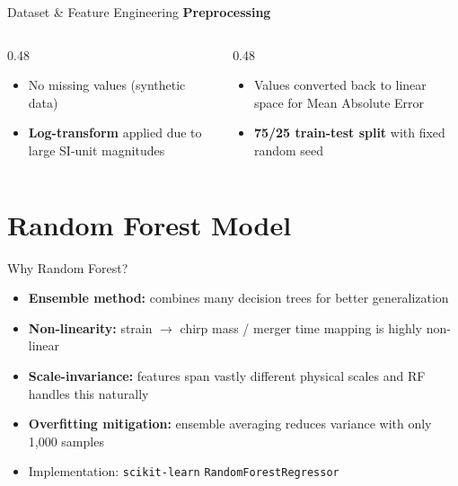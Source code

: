 \documentclass[aspectratio=169]{beamer}
\begin{document}
\begin{frame}{Dataset \& Feature Engineering}
  \vspace{0.8cm}
  \textbf{Preprocessing}
  \begin{columns}[t]
    \begin{column}{0.48\textwidth}
      \begin{itemize}
        \item No missing values (synthetic data)
        \vspace{0.2cm}
        \item \textbf{Log-transform} applied due to large SI-unit magnitudes
      \end{itemize}
    \end{column}
    \begin{column}{0.48\textwidth}
      \begin{itemize}
        \item Values converted back to linear space for Mean Absolute Error
        \vspace{0.2cm}
        \item \textbf{75/25 train-test split} with fixed random seed
      \end{itemize}
    \end{column}
  \end{columns}
\end{frame}

\section{Random Forest Model}

\begin{frame}{Why Random Forest?}
  \begin{itemize}
    \item \textbf{Ensemble method:} combines many decision trees for better generalization \parencite{Kavlakoglu2025}
    \vspace{0.3cm}
    \item \textbf{Non-linearity:} strain $\to$ chirp mass / merger time mapping is highly non-linear
    \vspace{0.3cm}
    \item \textbf{Scale-invariance:} features span vastly different physical scales and RF handles this naturally
    \vspace{0.3cm}
    \item \textbf{Overfitting mitigation:} ensemble averaging reduces variance with only 1,000 samples
    \vspace{0.3cm}
    \item Implementation: \texttt{scikit-learn} \texttt{RandomForestRegressor}
  \end{itemize}
\end{frame}
\end{document}
